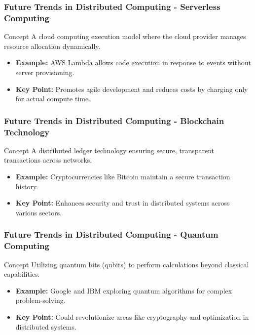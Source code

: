 \documentclass[aspectratio=169]{beamer}
\begin{document}
\begin{frame}[fragile]
    \frametitle{Future Trends in Distributed Computing - Serverless Computing}
    \begin{block}{Concept}
        A cloud computing execution model where the cloud provider manages resource allocation dynamically.
    \end{block}
    \begin{itemize}
        \item \textbf{Example:} AWS Lambda allows code execution in response to events without server provisioning.
        \item \textbf{Key Point:} Promotes agile development and reduces costs by charging only for actual compute time.
    \end{itemize}
\end{frame}

\begin{frame}[fragile]
    \frametitle{Future Trends in Distributed Computing - Blockchain Technology}
    \begin{block}{Concept}
        A distributed ledger technology ensuring secure, transparent transactions across networks.
    \end{block}
    \begin{itemize}
        \item \textbf{Example:} Cryptocurrencies like Bitcoin maintain a secure transaction history.
        \item \textbf{Key Point:} Enhances security and trust in distributed systems across various sectors.
    \end{itemize}
\end{frame}

\begin{frame}[fragile]
    \frametitle{Future Trends in Distributed Computing - Quantum Computing}
    \begin{block}{Concept}
        Utilizing quantum bits (qubits) to perform calculations beyond classical capabilities.
    \end{block}
    \begin{itemize}
        \item \textbf{Example:} Google and IBM exploring quantum algorithms for complex problem-solving.
        \item \textbf{Key Point:} Could revolutionize areas like cryptography and optimization in distributed systems.
    \end{itemize}
\end{frame}
\end{document}
